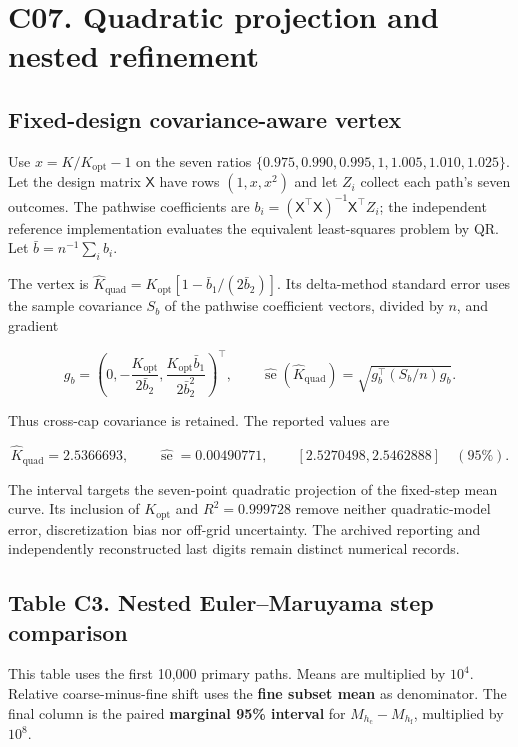 \documentclass[11pt,a4paper]{article}
\begin{document}
\section{C07. Quadratic projection and nested refinement}\label{c07}

\subsection{Fixed-design covariance-aware vertex}\label{c07-vertex}

Use \(x=K/K_{\mathrm{opt}}-1\) on the seven ratios
\(\{0.975,0.990,0.995,1,1.005,1.010,1.025\}\). Let the design matrix
\(\mathsf X\) have rows \((1,x,x^2)\) and let \(Z_i\) collect each
path's seven outcomes. The pathwise coefficients are
\(b_i=(\mathsf X^\top\mathsf X)^{-1}\mathsf X^\top Z_i\); the
independent reference implementation evaluates the equivalent
least-squares problem by QR. Let \(\bar b=n^{-1}\sum_i b_i\).

The vertex is
\(\widehat K_{\mathrm{quad}}=K_{\mathrm{opt}}[1-\bar b_1/(2\bar b_2)]\).
Its delta-method standard error uses the sample covariance \(S_b\) of
the pathwise coefficient vectors, divided by \(n\), and gradient

\[
g_b=\left(0,-\frac{K_{\mathrm{opt}}}{2\bar b_2},
\frac{K_{\mathrm{opt}}\bar b_1}{2\bar b_2^2}\right)^\top,
\qquad \widehat{\operatorname{se}}(\widehat K_{\mathrm{quad}})
=\sqrt{g_b^\top(S_b/n)g_b}.
\]

Thus cross-cap covariance is retained. The reported values are

\[
\widehat K_{\mathrm{quad}}=2.5366693,\qquad
\widehat{\operatorname{se}}=0.00490771,\qquad
[2.5270498,2.5462888]\quad(95\%).
\]

The interval targets the seven-point quadratic projection of the
fixed-step mean curve. Its inclusion of \(K_{\mathrm{opt}}\) and
\(R^2=0.999728\) remove neither quadratic-model error, discretization
bias nor off-grid uncertainty. The archived reporting and independently
reconstructed last digits remain distinct numerical records.

\subsection{Table C3. Nested Euler--Maruyama step
comparison}\label{table-c3}

This table uses the first 10,000 primary paths. Means are multiplied by
\(10^4\). Relative coarse-minus-fine shift uses the \textbf{fine subset
mean} as denominator. The final column is the paired \textbf{marginal
95\% interval} for \(M_{h_{\mathrm{c}}}-M_{h_{\mathrm{f}}}\), multiplied
by \(10^8\).
\end{document}
